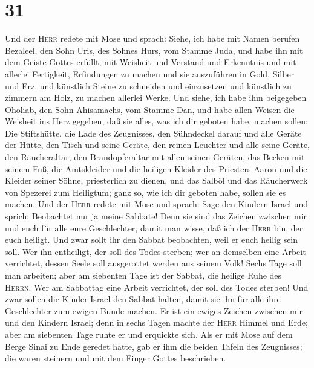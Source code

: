 \hypertarget{section-30}{%
\section{31}\label{section-30}}

 Und der \textsc{Herr} redete mit Mose und sprach:
 Siehe, ich habe mit Namen berufen Bezaleel, den Sohn
Uris, des Sohnes Hurs, vom Stamme Juda,  und habe ihn mit
dem Geiste Gottes erfüllt, mit Weisheit und Verstand und Erkenntnis und
mit allerlei Fertigkeit,  Erfindungen zu machen und sie
auszuführen in Gold, Silber und Erz,  und künstlich Steine
zu schneiden und einzusetzen und künstlich zu zimmern am Holz, zu machen
allerlei Werke.  Und siehe, ich habe ihm beigegeben
Oholiab, den Sohn Ahisamachs, vom Stamme Dan, und habe allen Weisen die
Weisheit ins Herz gegeben, daß sie alles, was ich dir geboten habe,
machen sollen:  Die Stiftshütte, die Lade des Zeugnisses,
den Sühndeckel darauf und alle Geräte der Hütte,  den
Tisch und seine Geräte, den reinen Leuchter und alle seine Geräte, den
Räucheraltar,  den Brandopferaltar mit allen seinen
Geräten, das Becken mit seinem Fuß,  die Amtskleider und
die heiligen Kleider des Priesters Aaron und die Kleider seiner Söhne,
priesterlich zu dienen,  und das Salböl und das
Räucherwerk von Spezerei zum Heiligtum; ganz so, wie ich dir geboten
habe, sollen sie es machen.  Und der \textsc{Herr} redete
mit Mose und sprach:  Sage den Kindern Israel und sprich:
Beobachtet nur ja meine Sabbate! Denn sie sind das Zeichen zwischen mir
und euch für alle eure Geschlechter, damit man wisse, daß ich der
\textsc{Herr} bin, der euch heiligt.  Und zwar sollt ihr
den Sabbat beobachten, weil er euch heilig sein soll. Wer ihn
entheiligt, der soll des Todes sterben; wer an demselben eine Arbeit
verrichtet, dessen Seele soll ausgerottet werden aus seinem Volk!
 Sechs Tage soll man arbeiten; aber am siebenten Tage ist
der Sabbat, die heilige Ruhe des \textsc{Herrn}. Wer am Sabbattag eine
Arbeit verrichtet, der soll des Todes sterben!  Und zwar
sollen die Kinder Israel den Sabbat halten, damit sie ihn für alle ihre
Geschlechter zum ewigen Bunde machen.  Er ist ein ewiges
Zeichen zwischen mir und den Kindern Israel; denn in sechs Tagen machte
der \textsc{Herr} Himmel und Erde; aber am siebenten Tage ruhte er und
erquickte sich.  Als er mit Mose auf dem Berge Sinai zu
Ende geredet hatte, gab er ihm die beiden Tafeln des Zeugnisses; die
waren steinern und mit dem Finger Gottes beschrieben.

